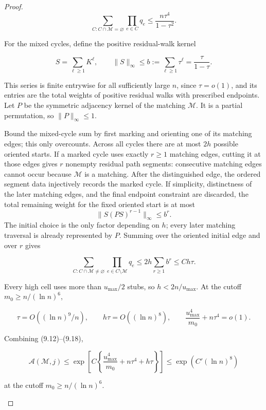 \documentclass[11pt,reqno]{amsart}
\newcommand{\displayheading}[1]{%
  \par\addvspace{0.68\baselineskip}%
  \noindent{\scshape #1.}\par\nobreak\smallskip\noindent}
\begin{document}
\begin{proof}
\[
 \sum_{C:C\cap \mathcal M=\varnothing}\prod_{e\in C}q_e
 \le\frac{n\tau^4}{1-\tau^2}.                            \tag{9.16}
\]

For the mixed cycles, define the positive residual-walk kernel

\[
 S=\sum_{\ell\ge1}K^\ell,\qquad
 \|S\|_\infty\le
 b:=\sum_{\ell\ge1}\tau^\ell=\frac\tau{1-\tau}.          \tag{9.17}
\]

This series is finite entrywise for all sufficiently large \(n\), since
\(\tau=o(1)\), and its entries are the total weights of positive residual
walks with prescribed endpoints. Let \(P\) be the symmetric adjacency
kernel of the matching \(\mathcal M\). It is a partial permutation, so
\(\|P\|_\infty\le1\).

Bound the mixed-cycle sum by first marking and orienting one of its matching
edges; this only overcounts. Across all cycles there are at most \(2h\)
possible oriented starts. If a marked cycle uses exactly \(r\ge1\) matching
edges, cutting it at those edges gives \(r\) nonempty
residual path segments: consecutive matching edges cannot occur because
\(\mathcal M\) is a matching. After the distinguished edge, the ordered
segment data injectively records the marked cycle. If simplicity, distinctness of
the later matching edges, and the final endpoint constraint are discarded,
the total remaining weight for the fixed oriented start is at most
\[
 \bigl\|S(PS)^{r-1}\bigr\|_\infty\le b^r.
\]
The initial choice is the only factor depending on \(h\); every later
matching traversal is already represented by \(P\). Summing over the
oriented initial edge and over \(r\) gives

\[
 \sum_{C:C\cap \mathcal M\ne\varnothing}
       \prod_{e\in C\setminus \mathcal M}q_e
 \le2h\sum_{r\ge1}b^r\le Ch\tau.                        \tag{9.18}
\]

Every high cell uses more than \(u_{\max}/2\) stubs, so
\(h<2n/u_{\max}\).  At the cutoff \(m_0\ge n/(\ln n)^6\),

\[
 \tau=O((\ln n)^9/n),\qquad
 h\tau=O((\ln n)^8),\qquad
 \frac{u_{\max}^4}{m_0}+n\tau^4=o(1).
\]

Combining (9.12)--(9.18),

\[
 \mathcal A(\mathcal M,j)
 \le\exp\left[C\left\{\frac{u_{\max}^4}{m_0}+n\tau^4+h\tau\right\}\right]
 \le\exp(C'(\ln n)^8)                                          \tag{9.19}
\]

at the cutoff \(m_0\ge n/(\ln n)^6\).

\displayheading{Small residual mass}\label{proof-small-residual-degree}


\end{proof}
\end{document}
